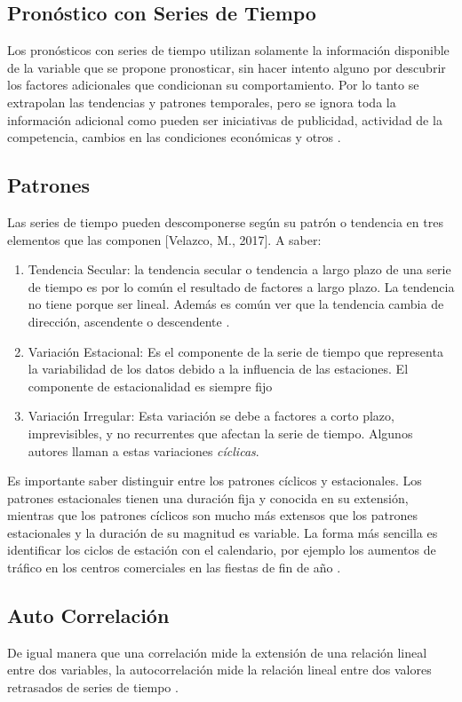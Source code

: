 \subsection{Pronóstico con Series de Tiempo}
Los pronósticos con series de tiempo utilizan solamente la información disponible de la variable que se propone pronosticar, sin hacer intento alguno por descubrir los factores adicionales que condicionan su comportamiento. Por lo tanto se extrapolan las tendencias y patrones temporales, pero se ignora toda la información adicional como pueden ser iniciativas de publicidad, actividad de la competencia, cambios en las condiciones económicas y otros \cite{hyndman}.

\subsection{Patrones}
Las series de tiempo pueden descomponerse según su patrón o tendencia en tres elementos que las componen [Velazco, M., 2017]. A saber:

\begin{enumerate}
	\item Tendencia Secular: la tendencia secular o tendencia a largo plazo de una serie de tiempo es por lo común el resultado de factores a largo plazo. La tendencia no tiene porque ser lineal. Además es común ver que la tendencia cambia de dirección, ascendente o descendente \cite{hyndman}.
	\item Variación Estacional: Es el componente de la serie de tiempo que representa la variabilidad de los datos debido a la influencia de las estaciones. El componente de estacionalidad es siempre fijo \cite{hyndman}
	\item Variación Irregular: Esta variación se debe a factores a corto plazo, imprevisibles, y no recurrentes que afectan la serie de tiempo. Algunos autores llaman a estas variaciones \emph{cíclicas}. 
\end{enumerate}

Es importante saber distinguir entre los patrones cíclicos y estacionales. Los patrones estacionales tienen una duración fija y conocida en su extensión, mientras que los patrones cíclicos son mucho más extensos que los patrones estacionales y la duración de su magnitud es variable. La forma más sencilla es identificar los ciclos de estación con el calendario, por ejemplo los aumentos de tráfico en los centros comerciales en las fiestas de fin de año \cite{hyndman}. 

\subsection{Auto Correlación}
De igual manera que una correlación mide la extensión de una relación lineal entre dos variables, la autocorrelación mide la relación lineal entre dos valores retrasados de series de tiempo \cite{hyndman}.

